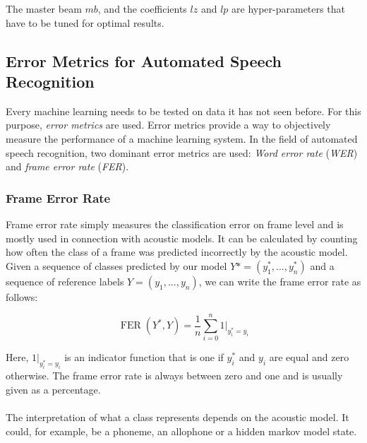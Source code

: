 The master beam $mb$, and the coefficients $lz$ and $lp$ are hyper-parameters that have to be tuned for optimal results. 

\subsection{Error Metrics for Automated Speech Recognition}
Every machine learning needs to be tested on data it has not seen before. For this purpose, \textit{error metrics} are used. Error metrics provide a way to objectively measure the performance of a machine learning system. In the field of automated speech recognition, two dominant error metrics are used: \textit{Word error rate} (\textit{WER}) and \textit{frame error rate} (\textit{FER}).

\subsubsection{Frame Error Rate}

Frame error rate simply measures the classification error on frame level and is mostly used in connection with acoustic models. It can be calculated by counting how often the class of a frame was predicted incorrectly by the acoustic model. Given a sequence of classes predicted by our model $Y* = (y^*_1, ..., y^*_n)$ and a sequence of reference labels $Y = (y_1, ..., y_n)$, we can write the frame error rate as follows:

\[
\operatorname{FER}(Y^*, Y) = \frac{1}{n} \sum_{i = 0}^n 1|_{y^*_i = y_i} 
\]

Here, $1|_{y^*_i = y_i}$ is an indicator function that is one if $y^*_i$ and $y_i$ are equal and zero otherwise. The frame error rate is always between zero and one and is usually given as a percentage. 
\\ \\ 
The interpretation of what a class represents depends on the acoustic model. It could, for example, be a phoneme, an allophone or a hidden markov model state. 

